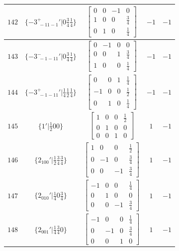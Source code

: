 \documentclass[fleqn,8pt]{jsarticle}
\begin{document}
\begin{longtable}{ccccc}
$ 142 $ & $ \{-3^{+}_{\,\,-11-1}{}'|0 \frac{3}{4} \frac{1}{4}\} $ & $ \begin{bmatrix} 0 & 0 & -1 & 0 \\ 1 & 0 & 0 & \frac{3}{4} \\ 0 & 1 & 0 & \frac{1}{4} \end{bmatrix} $ & $ -1 $ & $ -1 $ \\ \hline
$ 143 $ & $ \{-3^{-}_{\,\,-1-11}{}'|0 \frac{3}{4} \frac{1}{4}\} $ & $ \begin{bmatrix} 0 & -1 & 0 & 0 \\ 0 & 0 & 1 & \frac{3}{4} \\ 1 & 0 & 0 & \frac{1}{4} \end{bmatrix} $ & $ -1 $ & $ -1 $ \\ \hline
$ 144 $ & $ \{-3^{+}_{\,\,-1-11}{}'|\frac{1}{4} \frac{1}{2} \frac{1}{4}\} $ & $ \begin{bmatrix} 0 & 0 & 1 & \frac{1}{4} \\ -1 & 0 & 0 & \frac{1}{2} \\ 0 & 1 & 0 & \frac{1}{4} \end{bmatrix} $ & $ -1 $ & $ -1 $ \\ \hline
$ 145 $ & $ \{1{}'|\frac{1}{2} 0 0\} $ & $ \begin{bmatrix} 1 & 0 & 0 & \frac{1}{2} \\ 0 & 1 & 0 & 0 \\ 0 & 0 & 1 & 0 \end{bmatrix} $ & $ 1 $ & $ -1 $ \\ \hline
$ 146 $ & $ \{2{}_{100}{}'|\frac{1}{2} \frac{3}{4} \frac{3}{4}\} $ & $ \begin{bmatrix} 1 & 0 & 0 & \frac{1}{2} \\ 0 & -1 & 0 & \frac{3}{4} \\ 0 & 0 & -1 & \frac{3}{4} \end{bmatrix} $ & $ 1 $ & $ -1 $ \\ \hline
$ 147 $ & $ \{2{}_{010}{}'|\frac{1}{4} 0 \frac{3}{4}\} $ & $ \begin{bmatrix} -1 & 0 & 0 & \frac{1}{4} \\ 0 & 1 & 0 & 0 \\ 0 & 0 & -1 & \frac{3}{4} \end{bmatrix} $ & $ 1 $ & $ -1 $ \\ \hline
$ 148 $ & $ \{2{}_{001}{}'|\frac{1}{4} \frac{3}{4} 0\} $ & $ \begin{bmatrix} -1 & 0 & 0 & \frac{1}{4} \\ 0 & -1 & 0 & \frac{3}{4} \\ 0 & 0 & 1 & 0 \end{bmatrix} $ & $ 1 $ & $ -1 $ \\ \hline

\end{longtable}
\end{document}
